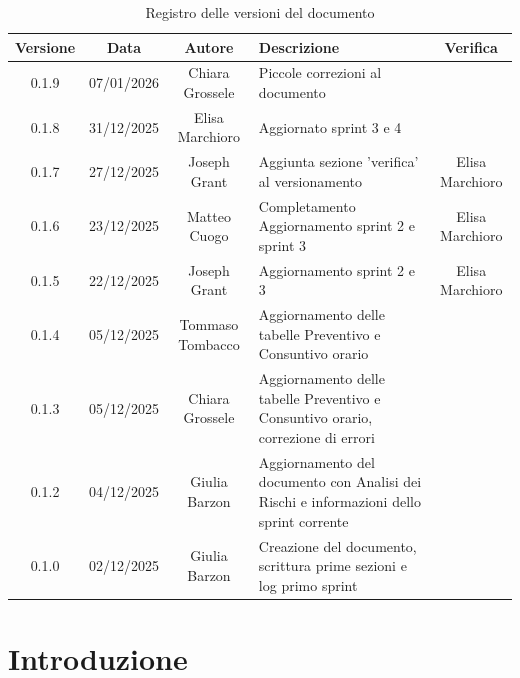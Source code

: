 \documentclass[11pt,a4paper]{article}
\begin{document}
\begin{table}[H]
    \centering
    \begin{tabular}{|c|c|c|>{\raggedright\arraybackslash}p{}|c|}
        \hline
        \textbf{Versione} & \textbf{Data} & \textbf{Autore} & \textbf{Descrizione} & \textbf{Verifica} \\
        \hline
        0.1.9 & 07/01/2026 & Chiara Grossele & Piccole correzioni al documento & \\ \hline
        0.1.8 & 31/12/2025 & Elisa Marchioro & Aggiornato sprint 3 e 4 & \\ \hline
        0.1.7 & 27/12/2025 & Joseph Grant & Aggiunta sezione 'verifica' al versionamento & Elisa Marchioro\\ \hline
        0.1.6 & 23/12/2025 & Matteo Cuogo & Completamento Aggiornamento sprint 2 e sprint 3 & Elisa Marchioro\\
        \hline
        0.1.5 & 22/12/2025 & Joseph Grant & Aggiornamento sprint 2 e 3 & Elisa Marchioro\\
        \hline
        0.1.4 & 05/12/2025 & Tommaso Tombacco & Aggiornamento delle tabelle Preventivo e Consuntivo orario & \\
        \hline
        0.1.3 & 05/12/2025 & Chiara Grossele & Aggiornamento delle tabelle Preventivo e Consuntivo orario, correzione di errori & \\
        \hline
        0.1.2 & 04/12/2025 & Giulia Barzon & Aggiornamento del documento con Analisi dei Rischi e informazioni dello sprint corrente & \\
        \hline
        0.1.0 & 02/12/2025 & Giulia Barzon & Creazione del documento, scrittura prime sezioni e log primo sprint & \\
        \hline
    \end{tabular}
    \caption{Registro delle versioni del documento}
    \label{tab:versionamento}
\end{table}

\newpage

\tableofcontents
\thispagestyle{empty}
\newpage

\setcounter{page}{1}

\section{Introduzione}
\end{document}
